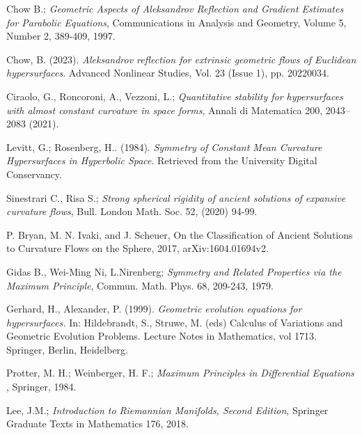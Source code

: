 \documentclass[a4paper, 12pt]{book}
\begin{document}
{}
\begin{thebibliography}{11} 
	 Chow B.; {\em Geometric Aspects of Aleksandrov Reflection and Gradient Estimates for Parabolic Equations}, Communications in Analysis and Geometry, Volume 5, Number 2, 389-409, 1997.
	
	 Chow, B. (2023). {\em Aleksandrov reflection for extrinsic geometric flows of Euclidean hypersurfaces}. Advanced Nonlinear Studies, Vol. 23 (Issue 1), pp. 20220034.
	
	 Ciraolo, G., Roncoroni, A., Vezzoni, L.;  {\em Quantitative stability for hypersurfaces with almost constant curvature in space forms}, Annali di Matematica 200, 2043–2083 (2021).
	
	Levitt, G.; Rosenberg, H.. (1984). {\em Symmetry of Constant Mean Curvature Hypersurfaces in Hyperbolic Space}. Retrieved from the University Digital Conservancy.%
	
	 Sinestrari C., Risa S.; {\em Strong spherical rigidity of ancient solutions of expansive curvature flows},  Bull. London Math. Soc. 52, (2020) 94-99. 
	
	P. Bryan, M. N. Ivaki, and J. Scheuer, On the Classification of Ancient Solutions to Curvature Flows on the Sphere, 2017,
	arXiv:1604.01694v2.
	
	 Gidas B., Wei-Ming Ni, L.Nirenberg; {\em Symmetry and Related Properties via the Maximum Principle},  Commun. Math. Phys. 68, 209-243, 1979. 
	
	 Gerhard, H., Alexander, P. (1999). {\em Geometric evolution equations for hypersurfaces.} In: Hildebrandt, S., Struwe, M. (eds) Calculus of Variations and Geometric Evolution Problems. Lecture Notes in Mathematics, vol 1713. Springer, Berlin, Heidelberg.
	
	
	  Protter, M. H.;  Weinberger, H. F.; {\em Maximum Principles in Differential Equations },  Springer, 1984. 
	
	
	 Lee, J.M.; {\em Introduction to Riemannian Manifolds, Second Edition},  Springer Graduate Texts in Mathematics 176, 2018. 
	

\end{thebibliography}
\end{document}

